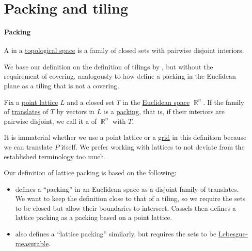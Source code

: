 \section{Packing and tiling}\label{sec:packing_and_tiling}

\paragraph{Packing}

\begin{definition}\label{def:topological_space_packing}\mimprovised
  A  in a \hyperref[def:topological_space]{topological space} is a family of closed sets with pairwise disjoint interiors.
\end{definition}
\begin{comments}
  \item We base our definition on the definition of tilings by \textcite[611]{Arenas1999Tilings}, but without the requirement of covering, analogously to how \textcite[16]{GrünbaumShephard1987TilingsAndPatterns} define a packing in the Euclidean plane as a tiling that is not a covering.
\end{comments}

\begin{definition}\label{def:lattice_packing}\mimprovised
  Fix a \hyperref[def:point_lattice]{point lattice} \( L \) and a closed set \( T \) in the \hyperref[def:euclidean_space]{Euclidean space} \( \BbbR^n \). If the family of \hyperref[def:rigid_motion/translation]{translates} of \( T \) by vectors in \( L \) is a \hyperref[def:topological_space_packing]{packing}, that is, if their interiors are pairwise disjoint, we call it a  of \( \BbbR^n \) with \( T \).
\end{definition}
\begin{comments}
  \item It is immaterial whether we use a point lattice or a \hyperref[def:euclidean_space_grid]{grid} in this definition because we can translate \( P \) itself. We prefer working with lattices to not deviate from the established terminology too much.

  \item Our definition of lattice packing is based on the following:
  \begin{itemize}
    \item \Textcite[223]{Cassels1997NumberGeometry} defines a \enquote{packing} in an Euclidean space as a disjoint family of translates. We want to keep the definition close to that of a tiling, so we require the sets to be closed but allow their boundaries to intersect. Cassels then defines a lattice packing as a packing based on a point lattice.

    \item \Textcite[1]{Rogers1964PackingAndCovering} also defines a \enquote{lattice packing} similarly, but requires the sets to be \hyperref[def:lebesgue_measure]{Lebesgue-measurable}.
  \end{itemize}
\end{comments}

